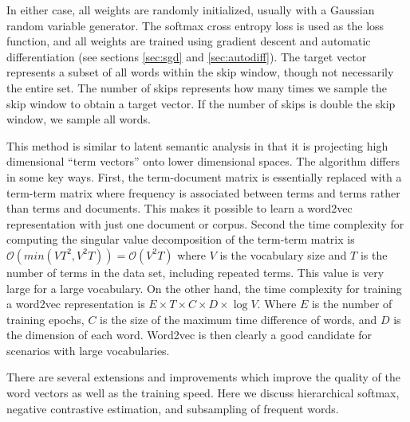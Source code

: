 In either case, all weights are randomly initialized, usually with a Gaussian random variable generator.  The softmax cross entropy loss is used as the loss function, and all weights are trained using gradient descent and automatic differentiation (see sections \ref{sec:sgd} and \ref{sec:autodiff}).  The target vector represents a subset of all words within the skip window, though not necessarily the entire set.  The number of skips represents how many times we sample the skip window to obtain a target vector.  If the number of skips is double the skip window, we sample all words.

This method is similar to latent semantic analysis in that it is projecting high dimensional ``term vectors'' onto lower dimensional spaces.  The algorithm differs in some key ways.  First, the term-document matrix is essentially replaced with a term-term matrix where frequency is associated between terms and terms rather than terms and documents.  This makes it possible to learn a word2vec representation with just one document or corpus.  Second the time complexity for computing the singular value decomposition of the term-term matrix is $\mathcal{O}(min(VT^2,V^2T)) = \mathcal{O}(V^2T)$ where $V$ is the vocabulary size and $T$ is the number of terms in the data set, including repeated terms.  This value is very large for a large vocabulary.  On the other hand, the time complexity for training a word2vec representation is $E\times T\times C\times D\times \log V$.  Where $E$ is the number of training epochs, $C$ is the size of the maximum time difference of words, and $D$ is the dimension of each word.  Word2vec is then clearly a good candidate for scenarios with large vocabularies.

There are several extensions and improvements which improve the quality of the word vectors as well as the training speed. \cite{tm13} Here we discuss hierarchical softmax, negative contrastive estimation, and subsampling of frequent words.

